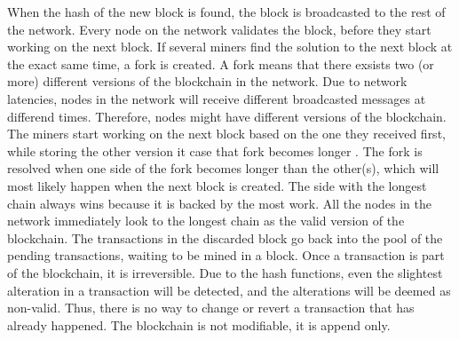 When the hash of the new block is found, the block is broadcasted to the rest of the network. Every node on the network validates the block, before they start working on the next block. If several miners find the solution to the next block at the exact same time, a fork is created. 
A fork means that there exsists two (or more) different versions of the blockchain in the network. Due to network latencies, nodes in the network will receive different broadcasted messages at differend times. Therefore, nodes might have different versions of the blockchain. The miners start working on the next block based on the one they received first, while storing the other version it case that fork becomes longer \cite{Nakamoto_bitcoin}. The fork is resolved when one side of the fork becomes longer than the other(s), which will most likely happen when the next block is created. The side with the longest chain always wins because it is backed by the most work. All the nodes in the network immediately look to the longest chain as the valid version of the blockchain. The transactions in the discarded block go back into the pool of the pending transactions, waiting to be mined in a block. Once a transaction is part of the blockchain, it is irreversible. Due to the hash functions, even the slightest alteration in a transaction will be detected, and the alterations will be deemed as non-valid. Thus, there is no way to change or revert a transaction that has already happened. The blockchain is not modifiable, it is append only. 








